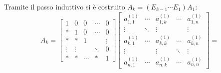 \begin{dimo}
\begin{itemize}
Tramite il passo induttivo si è costruito  $A_k = (E_{k-1}\cdots E_1)A_1$:
\[
A_k =
\left[
\begin{array}{ccccc}
1      & 0      & 0      & \cdots & 0 \\
*      & 1      & 0      & \cdots & 0 \\
*      & *      & 1      &        & \vdots \\
\vdots & \vdots &        & \ddots & 0  \\
*      & *      & \cdots & *      & 1
\end{array} \right]
\left[
\begin{array}{ccccc}
a_{1,1}^{(1)} & \cdots & a_{1,k}^{(1)}  & \cdots   & a_{1,n}^{(1)}\\
\vdots      & \ddots &   \vdots     &          & \vdots     \\
a_{k,1}^{(1)} & \cdots & a_{k,k}^{(1)}  & \cdots   & a_{k,n}^{(1)}\\
\vdots      &        & \vdots       & \ddots   & \vdots     \\
a_{n,1}^{(1)} & \cdots & a_{n,k}^{(1)}  & \cdots   & a_{n,n}^{(1)}
\end{array} \right]=
\]


\end{itemize}
\end{dimo}
